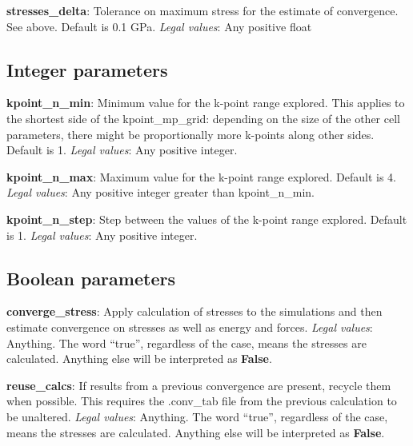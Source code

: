 \documentclass[10pt]{article}
\begin{document}
\textbf{stresses\_delta}: Tolerance on maximum stress for the estimate of convergence. See above. Default is 0.1 GPa.\newline
\textit{Legal values}: Any positive float\newline

\subsection{Integer parameters}

\textbf{kpoint\_n\_min}: Minimum value for the k-point range explored. This applies to the shortest side of the kpoint\_mp\_grid: depending on the size of the other cell parameters, there might be proportionally more k-points along other sides. Default is 1.\newline
\textit{Legal values}: Any positive integer.\newline

\textbf{kpoint\_n\_max}: Maximum value for the k-point range explored. Default is 4.\newline
\textit{Legal values}: Any positive integer greater than kpoint\_n\_min.\newline

\textbf{kpoint\_n\_step}: Step between the values of the k-point range explored. Default is 1.\newline
\textit{Legal values}: Any positive integer.\newline

\subsection{Boolean parameters}

\textbf{converge\_stress}: Apply calculation of stresses to the simulations and then estimate convergence on stresses as well as energy and forces.\newline
\textit{Legal values}: Anything. The word ``true'', regardless of the case, means the stresses are calculated. Anything else will be interpreted as \textbf{False}.\newline

\textbf{reuse\_calcs}: If results from a previous convergence are present, recycle them when possible. This requires the .conv\_tab file from the previous calculation to be unaltered.\newline
\textit{Legal values}: Anything. The word ``true'', regardless of the case, means the stresses are calculated. Anything else will be interpreted as \textbf{False}.\newline
\end{document}
